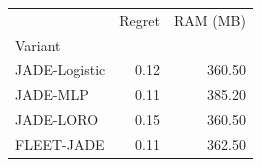 \begin{tabular}{lrr}
\toprule
 & Regret & RAM (MB) \\
Variant &  &  \\
\midrule
JADE-Logistic & 0.12 & 360.50 \\
JADE-MLP & 0.11 & 385.20 \\
JADE-LORO & 0.15 & 360.50 \\
FLEET-JADE & 0.11 & 362.50 \\
\bottomrule
\end{tabular}
